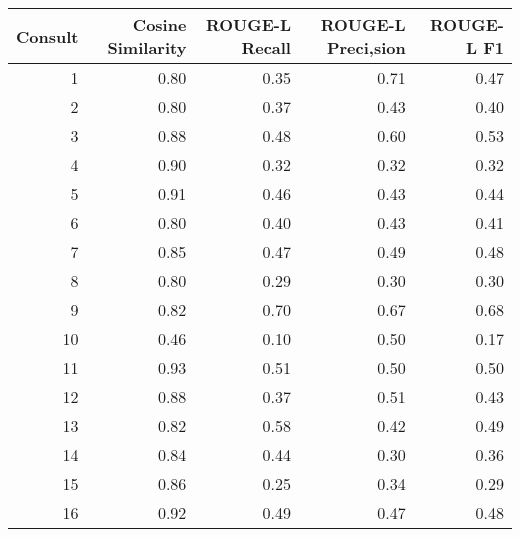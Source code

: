 \begin{tabular}{rrrrr}
\toprule
Consult & Cosine Similarity & ROUGE-L Recall & ROUGE-L Preci,sion & ROUGE-L F1 \\
\midrule
1 & 0.80 & 0.35 & 0.71 & 0.47 \\
2 & 0.80 & 0.37 & 0.43 & 0.40 \\
3 & 0.88 & 0.48 & 0.60 & 0.53 \\
4 & 0.90 & 0.32 & 0.32 & 0.32 \\
5 & 0.91 & 0.46 & 0.43 & 0.44 \\
6 & 0.80 & 0.40 & 0.43 & 0.41 \\
7 & 0.85 & 0.47 & 0.49 & 0.48 \\
8 & 0.80 & 0.29 & 0.30 & 0.30 \\
9 & 0.82 & 0.70 & 0.67 & 0.68 \\
10 & 0.46 & 0.10 & 0.50 & 0.17 \\
11 & 0.93 & 0.51 & 0.50 & 0.50 \\
12 & 0.88 & 0.37 & 0.51 & 0.43 \\
13 & 0.82 & 0.58 & 0.42 & 0.49 \\
14 & 0.84 & 0.44 & 0.30 & 0.36 \\
15 & 0.86 & 0.25 & 0.34 & 0.29 \\
16 & 0.92 & 0.49 & 0.47 & 0.48 \\
\bottomrule
\end{tabular}
